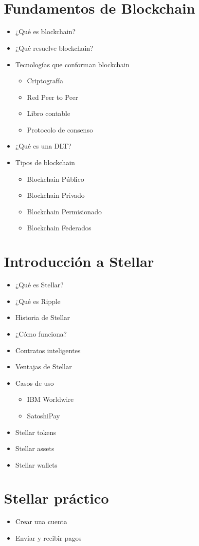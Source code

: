 \documentclass{/home/armando/Documentos/Cursos/LaTeX/Plantillas/lib/temarioptc}
\begin{document}
\vspace*{5mm}
\selectfont
\setlength{\parindent}{0pt}
\bigskip
{\color{colorPrimary}\Huge \mytitle }\\{\color{colorSecondary}\LARGE \mysubTitle } \\[2mm] \deliverDate

\selectfont

\section{Fundamentos de Blockchain}
\begin{itemize}
	\item ¿Qué es blockchain?
	\item ¿Qué resuelve blockchain?
	\item Tecnologías que conforman blockchain
	\begin{itemize}
		\item Criptografía
		\item Red Peer to Peer
		\item Libro contable
		\item Protocolo de consenso
	\end{itemize}
	\item ¿Qué es una DLT?
	\item Tipos de blockchain
	\begin{itemize}
		\item Blockchain Público
		\item Blockchain Privado
		\item Blockchain Permisionado
		\item Blockchain Federados
	\end{itemize}
\end{itemize}
\section{Introducción a Stellar}
\begin{itemize}
	\item ¿Qué es Stellar?
	\item ¿Qué es Ripple
	\item Historia de Stellar
	\item ¿Cómo funciona?
	\item Contratos inteligentes
	\item Ventajas de Stellar
	\item Casos de uso
	\begin{itemize}
		\item IBM Worldwire
		\item SatoshiPay
	\end{itemize}
	\item Stellar tokens
	\item Stellar assets
	\item Stellar wallets
\end{itemize}
\section{Stellar práctico}
\begin{itemize}
	\item Crear una cuenta
	\item Enviar y recibir pagos
\end{itemize}
\end{document}
